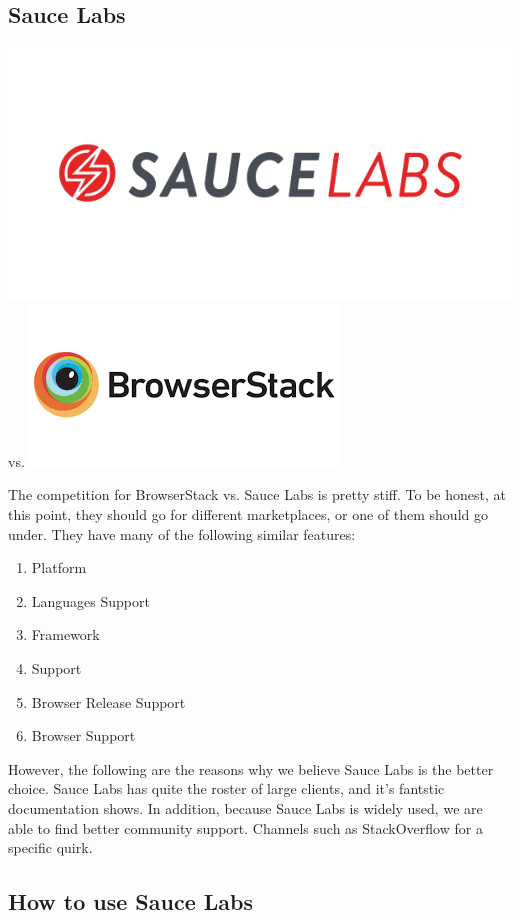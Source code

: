 \subsection{ Sauce Labs }
\includegraphics[scale=0.25]{pwa/pwa-toolset-sauce-labs/logo-sauce-labs}
vs.
\includegraphics[scale=0.4]{pwa/pwa-toolset-sauce-labs/logo-browserstack}

The competition for BrowserStack vs. Sauce Labs is pretty stiff. To be honest,
at this point, they should go for different marketplaces, or one of them should
go under. They have many of the following similar features:
\begin{enumerate}
  \item Platform
  \item Languages Support
  \item Framework
  \item Support
  \item Browser Release Support
  \item Browser Support
\end{enumerate}

However, the following are the reasons why we believe Sauce Labs is the better
choice. Sauce Labs has quite the roster of large clients, and it's fantstic
documentation shows. In addition, because Sauce Labs is widely used, we are able
to find better community support. Channels such as StackOverflow for a specific
quirk.

\subsection{ How to use Sauce Labs }
